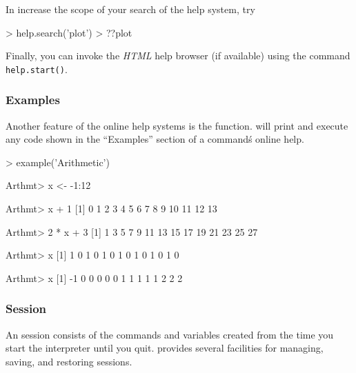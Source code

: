 \documentclass[10pt,letterpaper]{article}
\begin{document}
In increase the scope of your search of the help system, try

\begin{Schunk}
\begin{Sinput}
> help.search('plot')
> ??plot
\end{Sinput}
\end{Schunk}

Finally, you can invoke the \emph{HTML} help browser (if available) using the command \texttt{help.start()}.


\subsubsection{Examples} %
\label{ssub:examples}

Another feature of the online help systems is the  function.  \R will print and execute any code shown in the ``Examples'' section of a command\'s online help.

\begin{Schunk}
\begin{Sinput}
> example('Arithmetic')
\end{Sinput}
\begin{Soutput}
Arthmt> x <- -1:12

Arthmt> x + 1
 [1]  0  1  2  3  4  5  6  7  8  9 10 11 12 13

Arthmt> 2 * x + 3
 [1]  1  3  5  7  9 11 13 15 17 19 21 23 25 27

Arthmt> x %% 2 #-- is periodic
 [1] 1 0 1 0 1 0 1 0 1 0 1 0 1 0

Arthmt> x %/% 5
 [1] -1  0  0  0  0  0  1  1  1  1  1  2  2  2
\end{Soutput}
\end{Schunk}



\subsubsection{Session} %
\label{ssub:session}

An \R session consists of the commands and variables created from the time you start the \R interpreter until you quit.  \R provides several facilities for managing, saving, and restoring sessions.
\end{document}
